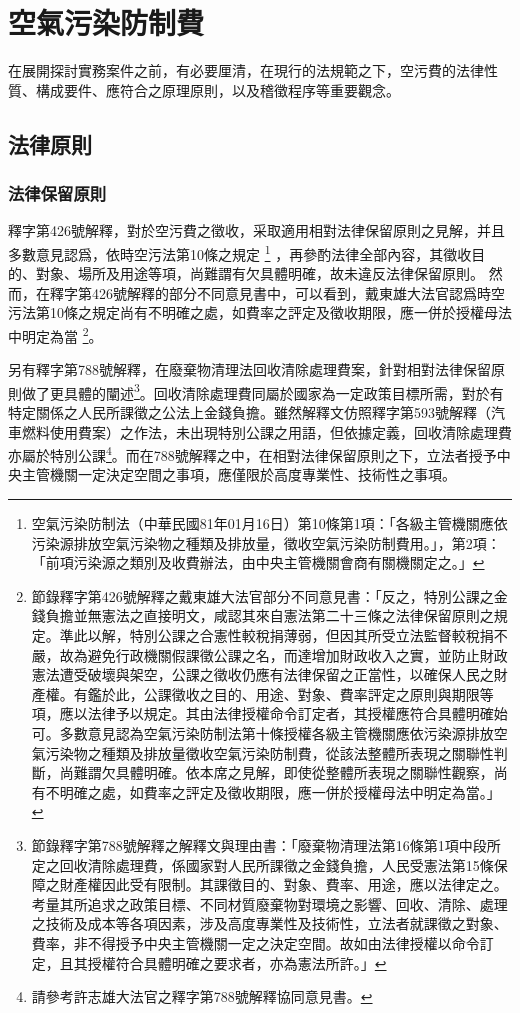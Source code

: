 \section{空氣污染防制費}

在展開探討實務案件之前，有必要厘清，在現行的法規範之下，空污費的法律性質、構成要件、應符合之原理原則，以及稽徵程序等重要觀念。


\subsection{法律原則}

\subsubsection{法律保留原則}

釋字第426號解釋，對於空污費之徵收，采取適用相對法律保留原則之見解，并且多數意見認爲，依時空污法第10條之規定
\footnote{空氣污染防制法（中華民國81年01月16日）第10條第1項：「各級主管機關應依污染源排放空氣污染物之種類及排放量，徵收空氣污染防制費用。」，第2項：「前項污染源之類別及收費辦法，由中央主管機關會商有關機關定之。」}
，再參酌法律全部內容，其徵收目的、對象、場所及用途等項，尚難謂有欠具體明確，故未違反法律保留原則。
然而，在釋字第426號解釋的部分不同意見書中，可以看到，戴東雄大法官認爲時空污法第10條之規定尚有不明確之處，如費率之評定及徵收期限，應一併於授權母法中明定為當
\footnote{節錄釋字第426號解釋之戴東雄大法官部分不同意見書：「反之，特別公課之金錢負擔並無憲法之直接明文，咸認其來自憲法第二十三條之法律保留原則之規定。準此以解，特別公課之合憲性較稅捐薄弱，但因其所受立法監督較稅捐不嚴，故為避免行政機關假課徵公課之名，而達增加財政收入之實，並防止財政憲法遭受破壞與架空，公課之徵收仍應有法律保留之正當性，以確保人民之財產權。有鑑於此，公課徵收之目的、用途、對象、費率評定之原則與期限等項，應以法律予以規定。其由法律授權命令訂定者，其授權應符合具體明確始可。多數意見認為空氣污染防制法第十條授權各級主管機關應依污染源排放空氣污染物之種類及排放量徵收空氣污染防制費，從該法整體所表現之關聯性判斷，尚難謂欠具體明確。依本席之見解，即使從整體所表現之關聯性觀察，尚有不明確之處，如費率之評定及徵收期限，應一併於授權母法中明定為當。」}。



另有釋字第788號解釋，在廢棄物清理法回收清除處理費案，針對相對法律保留原則做了更具體的闡述\footnote{節錄釋字第788號解釋之解釋文與理由書：「廢棄物清理法第16條第1項中段所定之回收清除處理費，係國家對人民所課徵之金錢負擔，人民受憲法第15條保障之財產權因此受有限制。其課徵目的、對象、費率、用途，應以法律定之。考量其所追求之政策目標、不同材質廢棄物對環境之影響、回收、清除、處理之技術及成本等各項因素，涉及高度專業性及技術性，立法者就課徵之對象、費率，非不得授予中央主管機關一定之決定空間。故如由法律授權以命令訂定，且其授權符合具體明確之要求者，亦為憲法所許。」}。回收清除處理費同屬於國家為一定政策目標所需，對於有特定關係之人民所課徵之公法上金錢負擔。雖然解釋文仿照釋字第593號解釋（汽車燃料使用費案）之作法，未出現特別公課之用語，但依據定義，回收清除處理費亦屬於特別公課\footnote{請參考許志雄大法官之釋字第788號解釋協同意見書。}。而在788號解釋之中，在相對法律保留原則之下，立法者授予中央主管機關一定決定空間之事項，應僅限於高度專業性、技術性之事項。

